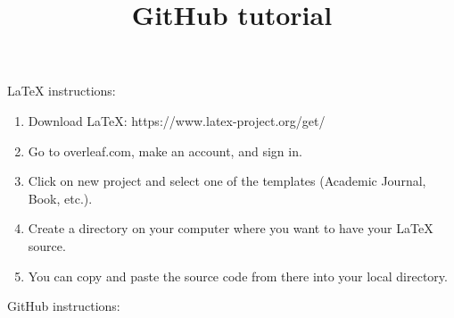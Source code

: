 \documentclass{article}
\begin{document}
\title{GitHub tutorial}

\maketitle

LaTeX instructions:

\begin{enumerate}
    \item Download LaTeX: https://www.latex-project.org/get/
    \item Go to overleaf.com, make an account, and sign in.
    \item Click on new project and select one of the templates (Academic Journal, Book, etc.).
    \item Create a directory on your computer where you want to have your LaTeX source.
    \item You can copy and paste the source code from there into your local directory.
\end{enumerate}

GitHub instructions:
\end{document}
